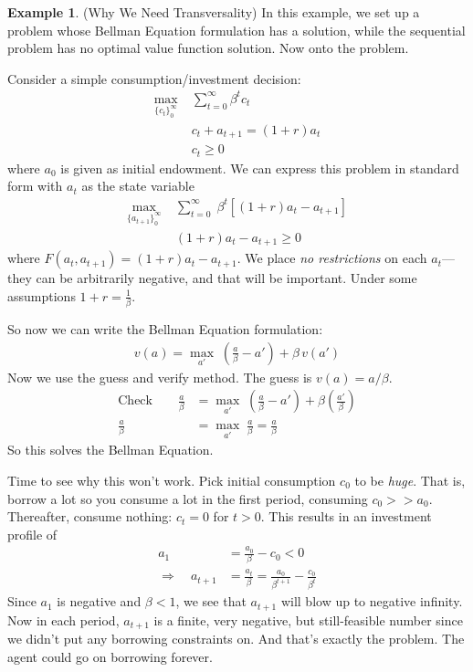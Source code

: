 \documentclass[12pt]{article}
\numberwithin{equation}{section} %
\theoremstyle{plain}
\theoremstyle{definition}
\newtheorem{ex}[thm]{Example}
\theoremstyle{remark}
\newcommand{\sumtinfz}{\sum^\infty_{t=0}}
\begin{document}

\begin{ex}{(Why We Need Transversality)}
In this example, we set up a problem whose Bellman Equation formulation
has a solution, while the sequential problem has no optimal value
function solution. Now onto the problem.

Consider a simple consumption/investment decision:
\begin{align*}
  \max_{\{c_t\}_0^\infty} \; &\sumtinfz \beta^t c_t \\
  & c_t + a_{t+1} = (1+r)a_t\\
  & c_t \geq 0
\end{align*}
where $a_0$ is given as initial endowment. We can express this problem
in standard form with $a_t$ as the state variable
\begin{align*}
  \max_{\{a_{t+1}\}_0^\infty} \;
  &\sumtinfz \; \beta^t [(1+r)a_t - a_{t+1}] \\
  & (1+r)a_t - a_{t+1} \geq 0
\end{align*}
where $F(a_t,a_{t+1}) = (1+r)a_t - a_{t+1}$.
We place \emph{no restrictions} on each $a_t$---they can be arbitrarily
negative, and that will be important.
Under some assumptions $1+r = \frac{1}{\beta}$.

So now we can write the Bellman Equation formulation:
\begin{align*}
  v(a) = \max_{a'} \; \left(\frac{a}{\beta} - a'\right) + \beta \, v(a')
\end{align*}
Now we use the guess and verify method. The guess is $v(a) = a/\beta$.
\begin{align*}
  \text{Check} \qquad
  \frac{a}{\beta}
  &= \max_{a'} \;
  \left(\frac{a}{\beta} - a'\right)
  + \beta \left(\frac{a'}{\beta}\right)\\
  \frac{a}{\beta}
  &= \max_{a'} \;
  \frac{a}{\beta}
  =
  \frac{a}{\beta}
\end{align*}
So this solves the Bellman Equation.

Time to see why this won't work. Pick initial consumption $c_0$ to be
\emph{huge}. That is, borrow a lot so you consume a lot in the first
period, consuming $c_0 >> a_0$.
Thereafter, consume nothing: $c_t=0$ for $t>0$. This results in an
investment profile of
\begin{align*}
  a_{1} &= \frac{a_0}{\beta} - c_0 < 0 \\
  \Rightarrow \quad
  a_{t+1} &= \frac{a_t}{\beta}
  = \frac{a_0}{\beta^{t+1}} - \frac{c_0}{\beta^t}
\end{align*}
Since $a_1$ is negative and $\beta<1$, we see that $a_{t+1}$ will blow
up to negative infinity.
Now in each period, $a_{t+1}$ is a finite, very negative, but
still-feasible number since we didn't put any borrowing constraints on.
And that's exactly the problem. The agent could go on borrowing forever.


\end{ex}
\end{document}
